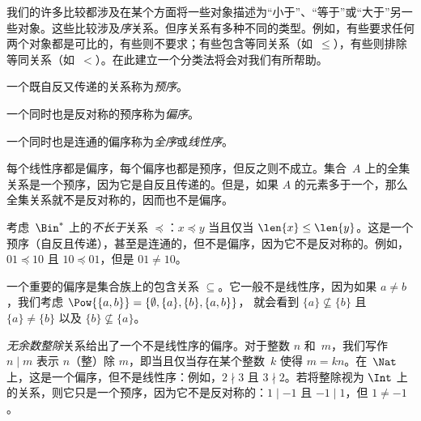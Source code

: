\documentclass[../../../include/open-logic-section]{subfiles}
\begin{document}

\begin{explain}
我们的许多比较都涉及在某个方面将一些对象描述为“小于”、“等于”或“大于”另一些对象。这些比较涉及\emph{序}关系。但序关系有多种不同的类型。例如，有些要求任何两个对象都是可比的，有些则不要求；有些包含等同关系（如~$\le$），有些则排除等同关系（如~$<$）。在此建立一个分类法将会对我们有所帮助。
\end{explain}

\begin{defn}[预序]
一个既自反又传递的关系称为\emph{预序}。
\end{defn}

\begin{defn}[偏序]
一个同时也是反对称的预序称为\emph{偏序}。
\end{defn}

\begin{defn}[全序]
一个同时也是连通的偏序称为\emph{全序}或\emph{线性序}。
\end{defn}

\begin{ex}
每个线性序都是偏序，每个偏序也都是预序，但反之则不成立。集合~$A$ 上的全集关系是一个预序，因为它是自反且传递的。但是，如果 $A$ 的元素多于一个，那么全集关系就不是反对称的，因而也不是偏序。
\end{ex}

\begin{ex}
考虑~$\Bin^*$ 上的\emph{不长于}关系 $\preccurlyeq$：$x \preccurlyeq y$ 当且仅当 $\len{x} \le \len{y}$。这是一个预序（自反且传递），甚至是连通的，但不是偏序，因为它不是反对称的。例如，$01 \preccurlyeq 10$ 且 $10 \preccurlyeq 01$，但是 $01 \neq 10$。
\end{ex}

\begin{ex}
一个重要的偏序是集合族上的包含关系 $\subseteq$。它一般不是线性序，因为如果 $a \neq b$，我们考虑 $\Pow{\{a, b\}} = \{\emptyset, \{a\}, \{b\}, \{a,b\}\}$，
就会看到 $\{a\} \nsubseteq \{b\}$ 且 $\{a\} \neq \{b\}$ 以及 $\{b\}
\nsubseteq \{a\}$。
\end{ex}

\begin{ex}
\emph{无余数整除}关系给出了一个不是线性序的偏序。对于整数 $n$ 和~$m$，我们写作 $n \mid m$ 表示 $n$（整）除 $m$，即当且仅当存在某个整数~$k$ 使得 $m = kn$。在~$\Nat$ 上，这是一个偏序，但不是线性序：例如，$2 \nmid 3$ 且 $3 \nmid 2$。若将整除视为 $\Int$ 上的关系，则它只是一个预序，因为它不是反对称的：$1 \mid -1$ 且 $-1 \mid 1$，但 $1 \neq -1$。
\end{ex}
\end{document}
